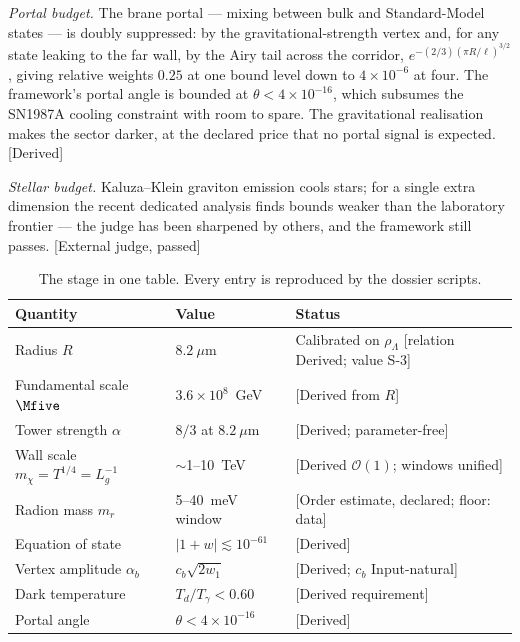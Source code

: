 \emph{Portal budget.} The brane portal --- mixing between bulk and Standard-Model states --- is doubly suppressed: by the gravitational-strength vertex and, for any state leaking to the far wall, by the Airy tail across the corridor, $e^{-(2/3)(\pi R/\ell)^{3/2}}$, giving relative weights $0.25$ at one bound level down to $4\times10^{-6}$ at four. The framework's portal angle is bounded at $\theta<4\times10^{-16}$, which subsumes the SN1987A cooling constraint with room to spare. The gravitational realisation makes the sector darker, at the declared price that no portal signal is expected. [Derived]

\emph{Stellar budget.} Kaluza--Klein graviton emission cools stars; for a single extra dimension the recent dedicated analysis \cite{Hardy} finds bounds weaker than the laboratory frontier --- the judge has been sharpened by others, and the framework still passes. [External judge, passed]

\begin{table}[h]
\centering\small
\begin{tabular}{lll}
\toprule
\textbf{Quantity} & \textbf{Value} & \textbf{Status}\\
\midrule
Radius $R$ & $8.2~\mu$m & Calibrated on $\rho_{\Lambda}$ [relation Derived; value S-3]\\
Fundamental scale $\Mfive$ & $3.6\times10^{8}$~GeV & [Derived from $R$]\\
Tower strength $\alpha$ & $8/3$ at $8.2~\mu$m & [Derived; parameter-free]\\
Wall scale $m_\chi=T^{1/4}=L_{g}^{-1}$ & $\sim$1--10~TeV & [Derived $\mathcal{O}(1)$; windows unified]\\
Radion mass $m_{r}$ & 5--40~meV window & [Order estimate, declared; floor: data]\\
Equation of state & $|1+w|\lesssim10^{-61}$ & [Derived]\\
Vertex amplitude $\alpha_{b}$ & $c_{b}\sqrt{2w_{1}}$ & [Derived; $c_{b}$ Input-natural]\\
Dark temperature & $T_{d}/T_{\gamma}<0.60$ & [Derived requirement]\\
Portal angle & $\theta<4\times10^{-16}$ & [Derived]\\
\bottomrule
\end{tabular}
\caption{The stage in one table. Every entry is reproduced by the dossier scripts.}
\end{table}

